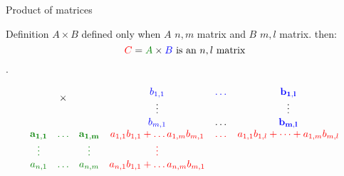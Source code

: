 \documentclass{beamer}
\begin{document}
\begin{frame}{Product of matrices}

  \begin{block}{Definition}
    \alert{$A \times B$ defined only when $A$ $n,m$ matrix and $B$ $m,l$ matrix.} then: \[{\color{red}C} = {\color{darkgreen} A} \times {\color{blue} B}\textnormal{  is an $n,l$ matrix} \].
    
    \[
    \begin{array}{cccccc}
      & \multirow{2}{*}{$\times$} & &  \color{blue}b_{1,1} &\color{blue} \dots & \bf\color{blue} b_{1,l}\\
      &                           & &  \vdots &       & \bf \vdots\\
      &                           & & \color{blue} b_{m,1}  & \dots & \bf \color{blue}b_{m, l}\\
      \bf \color{darkgreen}a_{1,1} &\bf \color{darkgreen} \dots & \bf \color{darkgreen}a_{1,m} & \color{red}a_{1,1}b_{1,1} + \dots a_{1,m}b_{m,1}  & \color{red}\dots  & \color{red}a_{1,1}b_{1, l} + \dots + a_{1, m}b_{m, l}\\
      \color{darkgreen}\vdots &       & \color{darkgreen}\vdots  &\color{red}\vdots  &  &\phantom{\color{red}\vdots} \\
      \color{darkgreen}a_{n,1} &  \color{darkgreen}\dots &  \color{darkgreen}a_{n, m}& \color{red}a_{n,1}b_{1,1} + \dots a_{n,m}b_{m,1}  & \phantom{\color{red}\dots}  & \phantom{\color{red}a_{n,1}b_{1, l} + \dots + a_{n, m}b_{m, l}}\\
    \end{array}
    \]
    
  \end{block}
  
\end{frame}
\end{document}
